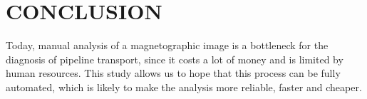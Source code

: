 \section{CONCLUSION}
\label{CONCLUSION}
Today, manual analysis of a magnetographic image is a bottleneck for the diagnosis of pipeline transport, since it costs a lot of money and is limited by human resources. This study allows us to hope that this process can be fully automated, which is likely to make the analysis more reliable, faster and cheaper.
